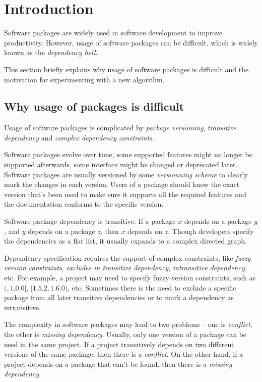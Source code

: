 \section{Introduction}

Software packages are widely used in software development to improve productivity. However, usage of software packages can be difficult, which is widely known as the \emph{dependency hell}.

This section briefly explains why usage of software packages is difficult and the motivation for experimenting with a new algorithm.

\subsection{Why usage of packages is difficult}
Usage of software packages is complicated by \emph{package versioning}, \emph{transitive dependency} and \emph{complex dependency constraints}.

Software packages evolve over time, some supported features might no longer be supported afterwards, some interface might be changed or deprecated later. Software packages are usually versioned by some \emph{versionning scheme} to clearly mark the changes in each version. Users of a package should know the exact version that's been used to make sure it supports all the required features and the documentation conforms to the specific version.

Software package dependency is transitive. If a package $x$ depends on a package $y$, and $y$ depends on a package $z$, then $x$ depends on $z$. Though developers specify the dependencies as a flat list, it usually expands to a complex directed graph.

Dependency specification requires the support of complex constraints, like \emph{fuzzy version constraints}, \emph{excludes in transitive dependency}, \emph{intransitive dependency}, etc. For example, a project may need to specify fuzzy version constraints, such as $(, 1.0.0]$, $[1.5.2, 1.6.0)$, etc. Sometimes there is the need to exclude a specific package from all later transitive dependencies or to mark a dependency as intransitive.

The complexity in software packages may lead to two problems -- one is \emph{conflict}, the other is \emph{missing dependency}. Usually, only one version of a package can be used in the same project. If a project transitively depends on two different versions of the same package, then there is a \emph{conflict}. On the other hand, if a project depends on a package that can't be found, then there is a \emph{missing dependency}.

